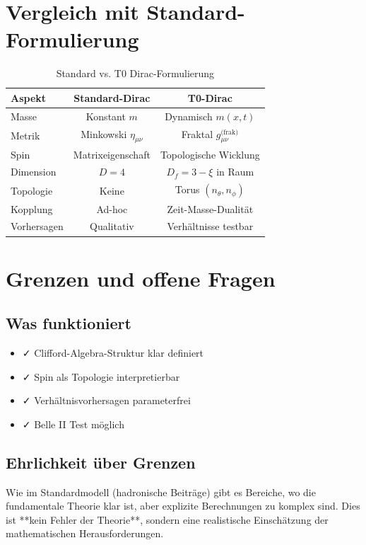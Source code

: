 	\section{Vergleich mit Standard-Formulierung}
	
	\begin{table}[h]
		\centering
		\begin{tabular}{lcc}
			\toprule
			\textbf{Aspekt} & \textbf{Standard-Dirac} & \textbf{T0-Dirac} \\
			\midrule
			Masse & Konstant $m$ & Dynamisch $m(x,t)$ \\
			Metrik & Minkowski $\eta_{\mu\nu}$ & Fraktal $g_{\mu\nu}^{\text{(frak)}}$ \\
			Spin & Matrixeigenschaft & Topologische Wicklung \\
			Dimension & $D = 4$ & $D_f = 3 - \xi$ in Raum \\
			Topologie & Keine & Torus $(n_\theta, n_\phi)$ \\
			Kopplung & Ad-hoc & Zeit-Masse-Dualität \\
			Vorhersagen & Qualitativ & Verhältnisse testbar \\
			\bottomrule
		\end{tabular}
		\caption{Standard vs. T0 Dirac-Formulierung}
	\end{table}
	
	\section{Grenzen und offene Fragen}
	
	\subsection{Was funktioniert}
	
	\begin{itemize}
		\item ✓ Clifford-Algebra-Struktur klar definiert
		\item ✓ Spin als Topologie interpretierbar
		\item ✓ Verhältnisvorhersagen parameterfrei
		\item ✓ Belle II Test möglich
	\end{itemize}

	\subsection{Ehrlichkeit über Grenzen}
	
	Wie im Standardmodell (hadronische Beiträge) gibt es Bereiche, wo die fundamentale 
	Theorie klar ist, aber explizite Berechnungen zu komplex sind. Dies ist **kein 
	Fehler der Theorie**, sondern eine realistische Einschätzung der mathematischen 
	Herausforderungen.
	
